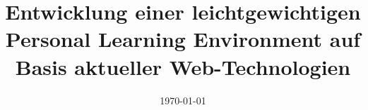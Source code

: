 \documentclass[a4paper, 11pt, oneside]{Thesis}  %
\begin{document}
\frontmatter	  %

\title  {Entwicklung einer leichtgewichtigen Personal Learning Environment auf Basis aktueller Web-Technologien}
\addresses  {\groupname\\\deptname\\\univname}  %
\date       {\today}
\subject    {}
\keywords   {}

\maketitle


\fancyhead{}  %
\rhead{\thepage}  %
\lhead{}  %

\pagestyle{fancy}  %




 
 
\end{document}
